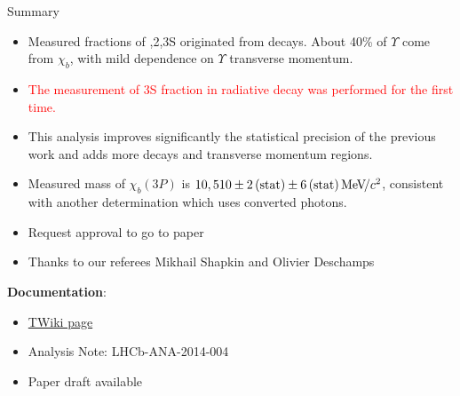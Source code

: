 \begin{frame}{Summary}

\begin{itemize}
\item Measured fractions of ,2,3S originated from \chib decays.
About 40\% of $\Upsilon$ come from $\chi_b$, with mild dependence on $\Upsilon$ transverse momentum.
\item \textcolor{red}{The measurement of \Y3S fraction in radiative \chibThreeP
decay was performed for the first time.}
\item This analysis improves significantly the statistical precision of the previous work and 
adds more decays and transverse momentum regions.
\item Measured mass of $\chi_b(3P)$ is $10{,510}\pm2\mathrm{\,(stat)}\pm6\mathrm{\,(stat)}{\mathrm{\,Me\kern -0.1em V\!/}c^2}$, consistent with another determination which uses converted photons.
\item Request approval to go to paper
\item Thanks to our referees Mikhail Shapkin and Olivier Deschamps
\end{itemize}

\textbf{Documentation}:

\begin{itemize}
\item \href{https://twiki.cern.ch/twiki/bin/view/LHCbPhysics/ChiB2fb}{TWiki page}
\item Analysis Note: LHCb-ANA-2014-004
\item Paper draft available
\end{itemize}

\end{frame}
